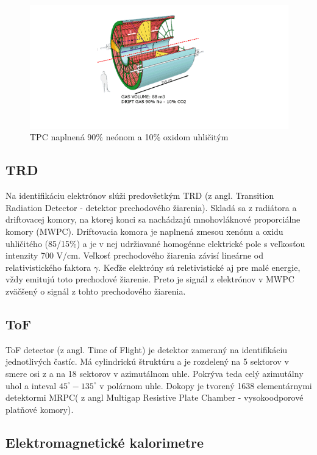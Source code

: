 \documentclass[thesismargins, thesislinespacing]{rnthesis}
\begin{document}
\begin{figure}[hbtp!]
	\begin{center}
		\includegraphics[width=\textwidth]{./Obrazky_praca/tpc.png}
		\caption{TPC naplnená 90\% neónom a 10\% oxidom uhličitým~\cite{TPCobr}}
		\label{tpc}
	\end{center}
\end{figure}

\subsection{TRD}
Na identifikáciu elektrónov slúži predovšetkým TRD (z angl. Transition Radiation Detector - detektor prechodového žiarenia). Skladá sa z radiátora a driftovacej komory, na ktorej konci sa nachádzajú mnohovláknové proporciálne komory (MWPC). Driftovacia komora je naplnená zmesou xenónu a oxidu uhličitého (85/15\%) a je v nej udržiavané homogénne elektrické pole s veľkosťou intenzity 700 V/cm. Veľkosť prechodového žiarenia závisí lineárne od relativistického faktora $\gamma$. Keďže elektróny sú reletivistické aj pre malé energie, vždy emitujú toto prechodové žiarenie. Preto je signál z elektrónov v MWPC zväčšený o signál z tohto prechodového žiarenia.

\subsection{ToF}
ToF detector (z angl. Time of Flight) je detektor zameraný na identifikáciu jednotlivých častíc. Má cylindrickú štruktúru a je rozdelený na 5 sektorov v smere osi z a na 18 sektorov v azimutálnom uhle. Pokrýva teda celý azimutálny uhol a inteval $45^\circ - 135^\circ$ v polárnom uhle. Dokopy je tvorený 1638 elementárnymi detektormi MRPC( z angl Multigap Resistive Plate Chamber - vysokoodporové platňové komory).

\subsection{Elektromagnetické kalorimetre}
\end{document}
